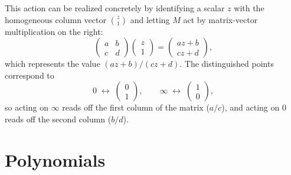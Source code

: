 \documentclass{article}
\begin{document}
This action can be realized concretely by identifying a scalar $z$ with the homogeneous column vector $\binom{z}{1}$ and letting $M$ act by matrix-vector multiplication on the right:
\begin{equation}
  \begin{pmatrix} a & b \\ c & d \end{pmatrix} \begin{pmatrix} z \\ 1 \end{pmatrix} = \begin{pmatrix} az + b \\ cz + d \end{pmatrix},
\end{equation}
which represents the value $(az + b)/(cz + d)$. The distinguished points correspond to
\begin{equation}
  0 \;\longleftrightarrow\; \begin{pmatrix} 0 \\ 1 \end{pmatrix}, \qquad
  \infty \;\longleftrightarrow\; \begin{pmatrix} 1 \\ 0 \end{pmatrix},
\end{equation}
so acting on $\infty$ reads off the first column of the matrix ($a/c$), and acting on $0$ reads off the second column ($b/d$).

\section{Polynomials}
\end{document}
